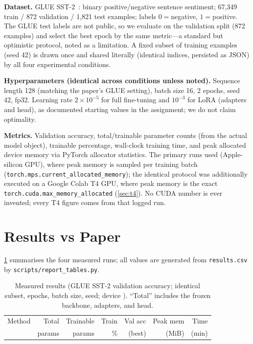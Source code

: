 \documentclass[conference]{IEEEtran}
\begin{document}
\textbf{Dataset.} GLUE SST-2~\cite{socher2013recursive,wang2018glue}: binary
positive/negative sentence sentiment; 67,349 train / 872 validation / 1,821 test
examples; labels $0{=}$negative, $1{=}$positive. The GLUE test labels are not
public, so we evaluate on the validation split (872 examples) and select the
best epoch by the same metric---a standard but optimistic protocol, noted as a
limitation. A fixed subset of \SubsetSize{} training examples (seed 42) is drawn
once and shared literally (identical indices, persisted as JSON) by all four
experimental conditions.

\textbf{Hyperparameters (identical across conditions unless noted).}
Sequence length 128 (matching the paper's GLUE setting), batch size 16, 2
epochs, seed 42, fp32. Learning rate $2\times10^{-5}$ for full fine-tuning and
$10^{-3}$ for LoRA (adapters and head), as documented starting values in the
assignment; we do not claim optimality.

\textbf{Metrics.} Validation accuracy, total/trainable parameter counts (from
the actual model object), trainable percentage, wall-clock training time, and
peak allocated device memory via PyTorch allocator statistics. The primary
runs used \DeviceName{} (Apple-silicon GPU), where peak memory is sampled per
training batch (\texttt{torch.mps.current\_allocated\_memory}); the identical
protocol was additionally executed on a Google Colab T4 GPU, where peak memory
is the exact \texttt{torch.cuda.max\_memory\_allocated} (\cref{sec:t4}). No
CUDA number is ever invented; every T4 figure comes from that logged run.

\section{Results vs Paper}
\label{sec:results}
\cref{tab:results} summarises the four measured runs; all values are generated
from \texttt{results.csv} by \texttt{scripts/report\_tables.py}.

\begin{table}[t]
\centering
\caption{Measured results (GLUE SST-2 validation accuracy; identical subset,
epochs, batch size, seed; device \DeviceName). ``Total'' includes the frozen
backbone, adapters, and head.}
\label{tab:results}
\small
\begin{tabular}{lrrrrrr}
\hline
Method & Total & Trainable & Train & Val acc & Peak mem & Time \\
 & params & params & \% & (best) & (MiB) & (min) \\
\hline

\end{tabular}
\end{table}
\end{document}
